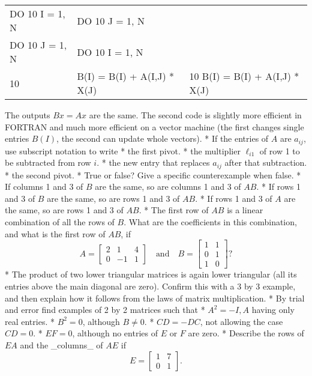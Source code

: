 

\begin{tabular}{l l l} DO 10 I = 1, N & DO 10 J = 1, N \\ DO 10 J = 1, N & DO 10 I = 1, N \\
10 & B(I) = B(I) + A(I,J) * X(J) & 10 B(I) = B(I) + A(I,J) * X(J) \\ \end{tabular} The outputs \(Bx=Ax\) are the same. The second code is slightly more efficient in FORTRAN and much more efficient on a vector machine (the first changes single entries \(B(I)\), the second can update whole vectors).
* If the entries of \(A\) are \(a_{ij}\), use subscript notation to write
* the first pivot.
* the multiplier \(\ell_{i1}\) of row 1 to be subtracted from row \(i\).
* the new entry that replaces \(a_{ij}\) after that subtraction.
* the second pivot.
* True or false? Give a specific counterexample when false.
* If columns 1 and 3 of \(B\) are the same, so are columns 1 and 3 of \(AB\).
* If rows 1 and 3 of \(B\) are the same, so are rows 1 and 3 of \(AB\).
* If rows 1 and 3 of \(A\) are the same, so are rows 1 and 3 of \(AB\).
* The first row of \(AB\) is a linear combination of all the rows of \(B\). What are the coefficients in this combination, and what is the first row of \(AB\), if \[A=\begin{bmatrix}2&1&4\\ 0&-1&1\end{bmatrix}\quad\text{and}\quad B=\begin{bmatrix}1&1\\ 0&1\\ 1&0\end{bmatrix}?\]
* The product of two lower triangular matrices is again lower triangular (all its entries above the main diagonal are zero). Confirm this with a 3 by 3 example, and then explain how it follows from the laws of matrix multiplication.
* By trial and error find examples of 2 by 2 matrices such that
* \(A^{2}=-I,A\) having only real entries.
* \(B^{2}=0\), although \(B\neq 0\).
* \(CD=-DC\), not allowing the case \(CD=0\).
* \(EF=0\), although no entries of \(E\) or \(F\) are zero.
* Describe the rows of \(EA\) and the _columns_ of \(AE\) if \[E=\begin{bmatrix}1&7\\ 0&1\end{bmatrix}.\]